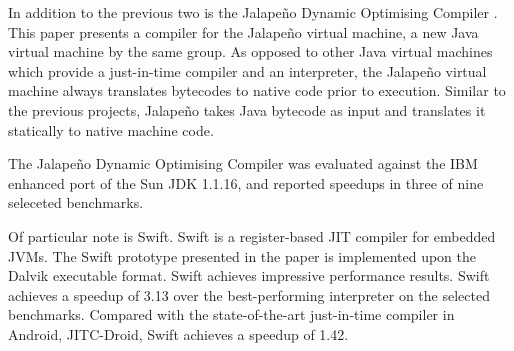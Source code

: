 In addition to the previous two is the Jalape\~{n}o Dynamic Optimising Compiler \cite{Burke:1999:JDO:304065.304113}. This paper presents a compiler for the Jalape\~{n}o virtual machine, a new Java virtual machine by the same group. As opposed to other Java virtual machines which provide a just-in-time compiler and an interpreter, the Jalape\~{n}o virtual machine always translates bytecodes to native code prior to execution. Similar to the previous projects, Jalape\~{n}o takes Java bytecode as input and translates it statically to native machine code.

The Jalape\~{n}o Dynamic Optimising Compiler was evaluated against the IBM enhanced port of the Sun JDK 1.1.16, and reported speedups in three of nine seleceted benchmarks.


Of particular note is Swift\cite{Zhang:2012:SRJ:2151024.2151035}. Swift is a register-based JIT compiler for embedded JVMs. The Swift prototype presented in the paper is implemented upon the Dalvik executable format. Swift achieves impressive performance results. Swift achieves a speedup of 3.13 over the best-performing interpreter on the selected benchmarks. Compared with the state-of-the-art just-in-time compiler in Android, JITC-Droid, Swift achieves a speedup of 1.42.

